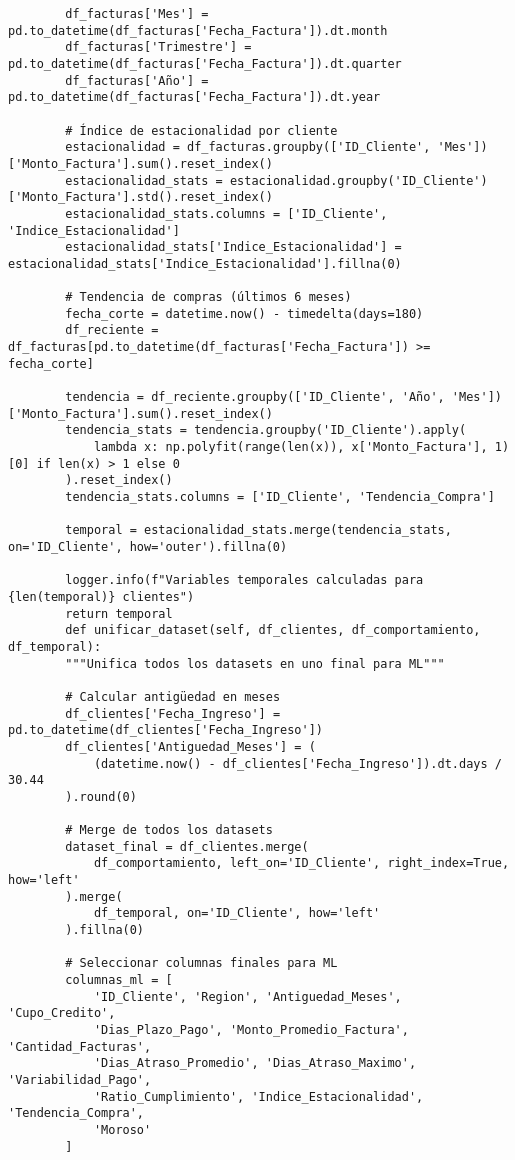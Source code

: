 \begin{verbatim}
        df_facturas['Mes'] = pd.to_datetime(df_facturas['Fecha_Factura']).dt.month
        df_facturas['Trimestre'] = pd.to_datetime(df_facturas['Fecha_Factura']).dt.quarter
        df_facturas['Año'] = pd.to_datetime(df_facturas['Fecha_Factura']).dt.year
        
        # Índice de estacionalidad por cliente
        estacionalidad = df_facturas.groupby(['ID_Cliente', 'Mes'])['Monto_Factura'].sum().reset_index()
        estacionalidad_stats = estacionalidad.groupby('ID_Cliente')['Monto_Factura'].std().reset_index()
        estacionalidad_stats.columns = ['ID_Cliente', 'Indice_Estacionalidad']
        estacionalidad_stats['Indice_Estacionalidad'] = estacionalidad_stats['Indice_Estacionalidad'].fillna(0)
        
        # Tendencia de compras (últimos 6 meses)
        fecha_corte = datetime.now() - timedelta(days=180)
        df_reciente = df_facturas[pd.to_datetime(df_facturas['Fecha_Factura']) >= fecha_corte]
        
        tendencia = df_reciente.groupby(['ID_Cliente', 'Año', 'Mes'])['Monto_Factura'].sum().reset_index()
        tendencia_stats = tendencia.groupby('ID_Cliente').apply(
            lambda x: np.polyfit(range(len(x)), x['Monto_Factura'], 1)[0] if len(x) > 1 else 0
        ).reset_index()
        tendencia_stats.columns = ['ID_Cliente', 'Tendencia_Compra']
        
        temporal = estacionalidad_stats.merge(tendencia_stats, on='ID_Cliente', how='outer').fillna(0)
        
        logger.info(f"Variables temporales calculadas para {len(temporal)} clientes")
        return temporal
        def unificar_dataset(self, df_clientes, df_comportamiento, df_temporal):
        """Unifica todos los datasets en uno final para ML"""
        
        # Calcular antigüedad en meses
        df_clientes['Fecha_Ingreso'] = pd.to_datetime(df_clientes['Fecha_Ingreso'])
        df_clientes['Antiguedad_Meses'] = (
            (datetime.now() - df_clientes['Fecha_Ingreso']).dt.days / 30.44
        ).round(0)
        
        # Merge de todos los datasets
        dataset_final = df_clientes.merge(
            df_comportamiento, left_on='ID_Cliente', right_index=True, how='left'
        ).merge(
            df_temporal, on='ID_Cliente', how='left'
        ).fillna(0)
        
        # Seleccionar columnas finales para ML
        columnas_ml = [
            'ID_Cliente', 'Region', 'Antiguedad_Meses', 'Cupo_Credito',
            'Dias_Plazo_Pago', 'Monto_Promedio_Factura', 'Cantidad_Facturas',
            'Dias_Atraso_Promedio', 'Dias_Atraso_Maximo', 'Variabilidad_Pago',
            'Ratio_Cumplimiento', 'Indice_Estacionalidad', 'Tendencia_Compra',
            'Moroso'
        ]
        

\end{verbatim}
